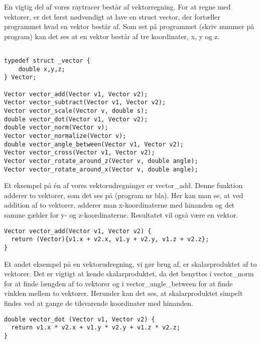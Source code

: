En vigtig del af vores raytracer består af vektorregning. For at regne med vektorer, er det først nødvendigt at lave en struct vector, der fortæller programmet hvad en vektor består af. Som set på programmet (skriv nummer på program) kan det ses at en vektor består af tre koordinater, x, y og z. 

\begin{lstlisting}[style=Cstyle, caption=Vektorprototyper og struct]

typedef struct _vector {
    double x,y,z;
} Vector;

Vector vector_add(Vector v1, Vector v2);
Vector vector_subtract(Vector v1, Vector v2);
Vector vector_scale(Vector v, double s);
double vector_dot(Vector v1, Vector v2);
double vector_norm(Vector v);
Vector vector_normalize(Vector v);
double vector_angle_between(Vector v1, Vector v2);
Vector vector_cross(Vector v1, Vector v2);
Vector vector_rotate_around_z(Vector v, double angle);
Vector vector_rotate_around_x(Vector v, double angle);

\end{lstlisting}

Et eksempel på én af vores vektorudregninger er vector\_add. Denne funktion adderer to vektorer, som det ses på (program nr bla). Her kan man se, at ved addition af to vektorer, adderer man x-koordinaterne med hinanden og det samme gælder for y- og z-koordinaterne. Resultatet vil også være en vektor.

\begin{lstlisting}[style=Cstyle, caption=vector add]
Vector vector_add(Vector v1, Vector v2) {
  return (Vector){v1.x + v2.x, v1.y + v2.y, v1.z + v2.z};
}

\end{lstlisting}

Et andet eksempel på en vektorudregning, vi gør brug af, er skalarproduktet af to vektorer. Det er vigtigt at kende skalarproduktet, da det benyttes i vector\_norm for at finde længden af to vektorer og i vector\_angle\_between for at finde vinklen mellem to vektorer. Herunder kan det ses, at skalarproduktet simpelt findes ved at gange de tilsvarende koordinater med hinanden.

\begin{lstlisting}[style=Cstyle, caption=vector dot]
double vector_dot (Vector v1, Vector v2) {
  return v1.x * v2.x + v1.y * v2.y + v1.z * v2.z;
}
\end{lstlisting}

